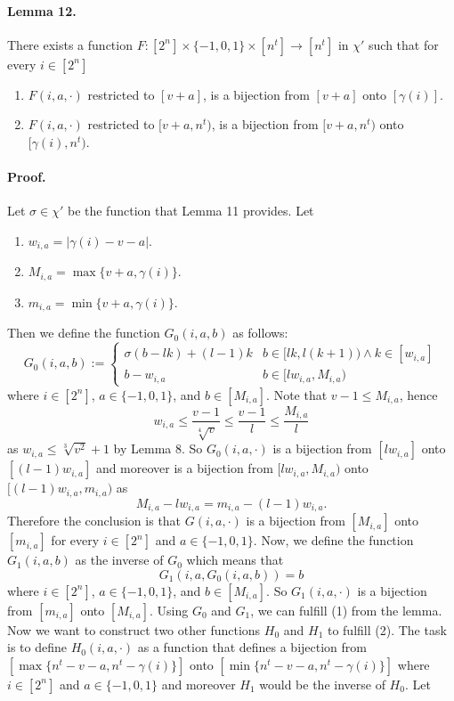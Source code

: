 \documentclass[10pt,a4paper]{article}
\begin{document}
\paragraph{Lemma 12.} There exists a function $F:[2^n]\times\{-1,0,1\}\times[n^t]\to[n^t]$ in $\chi'$ such that for every $i\in[2^n]$
\begin{enumerate}
\item $F(i,a,\cdot)$ restricted to $[v+a]$, is a bijection from $[v+a]$ onto $[\gamma(i)]$.
\item $F(i,a,\cdot)$ restricted to $[v+a,n^t)$, is a bijection from $[v+a,n^t)$ onto $[\gamma(i),n^t)$.
\end{enumerate}
\paragraph{Proof.} Let $\sigma\in\chi'$ be the function that Lemma 11 provides. Let
\begin{enumerate}
\item $w_{i,a}=|\gamma(i)-v-a|$.
\item $M_{i,a}=\max\{v+a,\gamma(i)\}$.
\item $m_{i,a}=\min\{v+a,\gamma(i)\}$.
\end{enumerate}
Then we define the function $G_0(i,a,b)$ as follows:
\[G_0(i,a,b):=\begin{cases}\sigma(b-lk)+(l-1)k&b\in[lk,l(k+1))\wedge k\in[w_{i,a}]\\b-w_{i,a}&b\in[lw_{i,a},M_{i,a})\end{cases}\]
where $i\in[2^n]$, $a\in\{-1,0,1\}$, and $b\in[M_{i,a}]$.
Note that $v-1\leq M_{i,a}$, hence
\[w_{i,a}\leq\frac{v-1}{\sqrt[4]v}\leq\frac{v-1}l\leq\frac{M_{i,a}}l\]
as $w_{i,a}\leq\sqrt[3]{v^2}+1$ by Lemma 8. So $G_0(i,a,\cdot)$ is a bijection from $[lw_{i,a}]$ onto $[(l-1)w_{i,a}]$ and moreover is a bijection from $[lw_{i,a},M_{i,a})$ onto $[(l-1)w_{i,a},m_{i,a})$ as
\[M_{i,a}-lw_{i,a}=m_{i,a}-(l-1)w_{i,a}.\]
Therefore the conclusion is that $G(i,a,\cdot)$ is a bijection from $[M_{i,a}]$ onto $[m_{i,a}]$ for every $i\in[2^n]$ and $a\in\{-1,0,1\}$. Now, we define the function $G_1(i,a,b)$ as the inverse of $G_0$ which means that
\[G_1(i,a,G_0(i,a,b))=b\]
where $i\in[2^n]$, $a\in\{-1,0,1\}$, and $b\in[M_{i,a}]$. So $G_1(i,a,\cdot)$ is a bijection from $[m_{i,a}]$ onto $[M_{i,a}]$.
Using $G_0$ and $G_1$, we can fulfill (1) from the lemma. Now we want to construct two other functions $H_0$ and $H_1$ to fulfill (2).
The task is to define $H_0(i,a,\cdot)$ as a function that defines a bijection from $[\max\{n^t-v-a,n^t-\gamma(i)\}]$ onto $[\min\{n^t-v-a,n^t-\gamma(i)\}]$ where $i\in[2^n]$ and $a\in\{-1,0,1\}$ and moreover $H_1$ would be the inverse of $H_0$. Let
\end{document}
